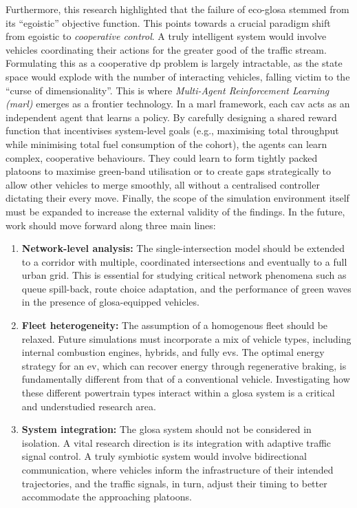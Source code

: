 Furthermore, this research highlighted that the failure of \ac{eco-glosa} stemmed from its \enquote{egoistic} objective function. This points towards a crucial paradigm shift from egoistic to \textit{cooperative control}. A truly intelligent system would involve vehicles coordinating their actions for the greater good of the traffic stream. Formulating this as a cooperative \ac{dp} problem is largely intractable, as the state space would explode with the number of interacting vehicles, falling victim to the \enquote{curse of dimensionality}. This is where \textit{Multi-Agent Reinforcement Learning (\ac{marl})} emerges as a frontier technology. In a \ac{marl} framework, each \ac{cav} acts as an independent agent that learns a policy. By carefully designing a shared reward function that incentivises system-level goals (e.g., maximising total throughput while minimising total fuel consumption of the cohort), the agents can learn complex, cooperative behaviours. They could learn to form tightly packed platoons to maximise green-band utilisation or to create gaps strategically to allow other vehicles to merge smoothly, all without a centralised controller dictating their every move.
\mynewline
Finally, the scope of the simulation environment itself must be expanded to increase the external validity of the findings. In the future, work should move forward along three main lines:
\begin{enumerate}
    \item \textbf{Network-level analysis:} The single-intersection model should be extended to a corridor with multiple, coordinated intersections and eventually to a full urban grid. This is essential for studying critical network phenomena such as queue spill-back, route choice adaptation, and the performance of green waves in the presence of \ac{glosa}-equipped vehicles.
    \item \textbf{Fleet heterogeneity:} The assumption of a homogenous fleet should be relaxed. Future simulations must incorporate a mix of vehicle types, including internal combustion engines, hybrids, and fully \acp{ev}. The optimal energy strategy for an \ac{ev}, which can recover energy through regenerative braking, is fundamentally different from that of a conventional vehicle. Investigating how these different powertrain types interact within a \ac{glosa} system is a critical and understudied research area.
    \item \textbf{System integration:} The \ac{glosa} system should not be considered in isolation. A vital research direction is its integration with adaptive traffic signal control. A truly symbiotic system would involve bidirectional communication, where vehicles inform the infrastructure of their intended trajectories, and the traffic signals, in turn, adjust their timing to better accommodate the approaching platoons.
\end{enumerate}

